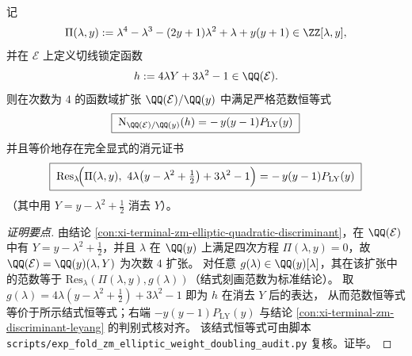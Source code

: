 \begin{conclusion}\label{con:xi-terminal-zm-leyang-norm-certificate}
记
\[
\Pi(\lambda,y):=\lambda^{4}-\lambda^{3}-(2y+1)\lambda^{2}+\lambda+y(y+1)\in\ZZ[\lambda,y],
\]
并在 \(\mathcal{E}\) 上定义切线锁定函数
\[
h:=4\lambda Y+3\lambda^{2}-1\in\QQ(\mathcal{E}).
\]
则在次数为 \(4\) 的函数域扩张 \(\QQ(\mathcal{E})/\QQ(y)\) 中满足严格范数恒等式
\[
\boxed{\;
\mathrm{N}_{\QQ(\mathcal{E})/\QQ(y)}(h)=-\,y(y-1)P_{\mathrm{LY}}(y)\;}
\]
并且等价地存在完全显式的消元证书
\[
\boxed{\;
\mathrm{Res}_{\lambda}\!\Bigl(\Pi(\lambda,y),\ 4\lambda\bigl(y-\lambda^{2}+\tfrac12\bigr)+3\lambda^{2}-1\Bigr)=-\,y(y-1)P_{\mathrm{LY}}(y)\;}
\]
（其中用 \(Y=y-\lambda^{2}+\tfrac12\) 消去 \(Y\)）。

\end{conclusion}
\begin{proof}[证明要点]
由结论 \ref{con:xi-terminal-zm-elliptic-quadratic-discriminant}，在 \(\QQ(\mathcal{E})\) 中有
\(
Y=y-\lambda^{2}+\tfrac12
\)，并且 \(\lambda\) 在 \(\QQ(y)\) 上满足四次方程 \(\Pi(\lambda,y)=0\)，故 \(\QQ(\mathcal{E})=\QQ(y)(\lambda,Y)\) 为次数 \(4\) 扩张。
对任意 \(g(\lambda)\in\QQ(y)[\lambda]\)，其在该扩张中的范数等于 \(\mathrm{Res}_{\lambda}(\Pi(\lambda,y),g(\lambda))\)（结式刻画范数为标准结论）。
取 \(g(\lambda)=4\lambda(y-\lambda^{2}+\tfrac12)+3\lambda^{2}-1\) 即为 \(h\) 在消去 \(Y\) 后的表达，
从而范数恒等式等价于所示结式恒等式；右端 \(-y(y-1)P_{\mathrm{LY}}(y)\) 与结论 \ref{con:xi-terminal-zm-discriminant-leyang} 的判别式核对齐。
该结式恒等式可由脚本 \texttt{scripts/exp\_fold\_zm\_elliptic\_weight\_doubling\_audit.py} 复核。证毕。
\end{proof}

